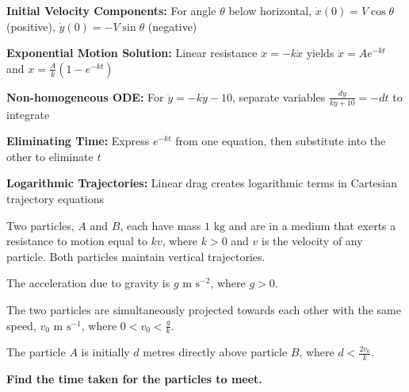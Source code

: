 \begin{takeaways}
\item \textbf{Initial Velocity Components:} For angle $\theta$ below horizontal, $\dot{x}(0) = V\cos\theta$ (positive), $\dot{y}(0) = -V\sin\theta$ (negative)
\item \textbf{Exponential Motion Solution:} Linear resistance $\ddot{x} = -k\dot{x}$ yields $\dot{x} = Ae^{-kt}$ and $x = \frac{A}{k}(1-e^{-kt})$
\item \textbf{Non-homogeneous ODE:} For $\ddot{y} = -k\dot{y} - 10$, separate variables $\frac{d\dot{y}}{k\dot{y}+10} = -dt$ to integrate
\item \textbf{Eliminating Time:} Express $e^{-kt}$ from one equation, then substitute into the other to eliminate $t$
\item \textbf{Logarithmic Trajectories:} Linear drag creates logarithmic terms in Cartesian trajectory equations
\end{takeaways}

\newpage

\begin{problem}
Two particles, $A$ and $B$, each have mass $1 \text{ kg}$ and are in a medium that exerts a resistance to motion equal to $kv$, where $k > 0$ and $v$ is the velocity of any particle. Both particles maintain vertical trajectories.

The acceleration due to gravity is $g \text{ m s}^{-2}$, where $g > 0$.

The two particles are simultaneously projected towards each other with the same speed, $v_0 \text{ m s}^{-1}$, where $0 < v_0 < \frac{g}{k}$.

The particle $A$ is initially $d$ metres directly above particle $B$, where $d < \frac{2v_0}{k}$.

\textbf{Find the time taken for the particles to meet.}
\end{problem}

